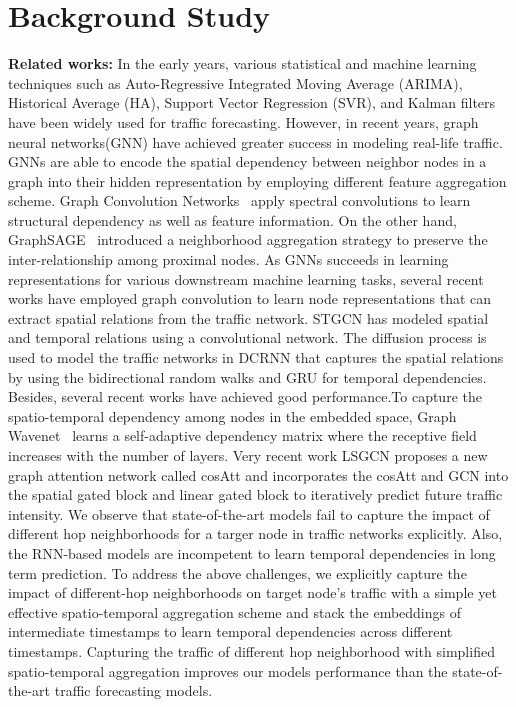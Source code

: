 \documentclass[runningheads]{llncs}
\begin{document}
\section{Background Study}
\textbf{Related works:} In the early years, various statistical and machine learning techniques such as Auto-Regressive Integrated Moving Average (ARIMA), Historical Average (HA), Support Vector Regression (SVR), and Kalman filters have been widely used for traffic forecasting. However, in recent years, graph neural networks(GNN) have achieved greater success in modeling real-life traffic. GNNs are able to encode the spatial dependency between neighbor nodes in a graph into their hidden representation by employing different feature aggregation scheme. Graph Convolution Networks~\cite{kipf2016semi,defferrard2016convolutional} apply spectral convolutions to learn structural dependency as well as feature information. On the other hand, GraphSAGE~\cite{hamilton2017inductive} introduced a neighborhood aggregation strategy to preserve the inter-relationship among proximal nodes. As GNNs succeeds in learning representations for various downstream machine learning tasks, several recent works have employed graph convolution to learn node representations that can extract spatial relations from the traffic network. STGCN\cite{yu2017spatio} has modeled spatial and temporal relations using a convolutional network.
The diffusion process is used to model the traffic networks in DCRNN\cite{li2017diffusion} that captures the spatial relations by using the bidirectional random walks and GRU for temporal dependencies. Besides, several recent works\cite{wu2019graph,fang2019gstnet,park2019stgrat} have achieved good performance.To capture the spatio-temporal dependency among nodes in the embedded space, Graph Wavenet~\cite{wu2019graph} learns a self-adaptive dependency matrix where the receptive field increases with the number of layers.  Very recent work LSGCN\cite{ijcai2020-326} proposes a new graph attention network
called cosAtt and incorporates the cosAtt and GCN into the spatial gated block and linear gated block to iteratively predict future traffic intensity.  We observe that state-of-the-art models fail to capture the impact of different hop neighborhoods for a targer node in traffic networks explicitly. Also, the RNN-based models are incompetent to learn temporal dependencies in long term prediction. To address the above challenges, we explicitly capture the impact of different-hop neighborhoods on target node's traffic with a simple yet effective spatio-temporal aggregation scheme and stack the embeddings of intermediate timestamps to learn temporal dependencies across different timestamps. Capturing the traffic of different hop neighborhood with simplified spatio-temporal aggregation improves our models performance than the state-of-the-art traffic forecasting models.
\end{document}
